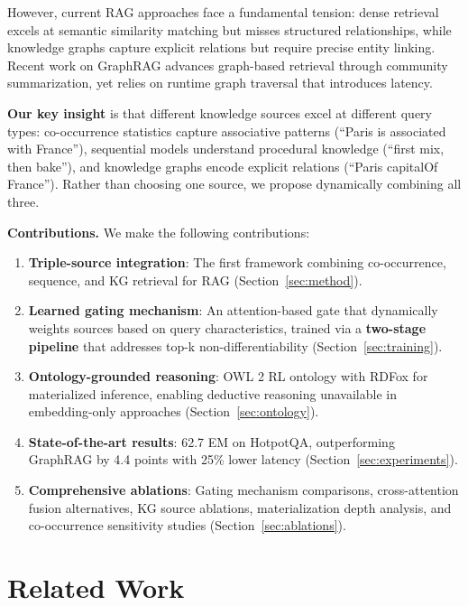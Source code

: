 \documentclass[10pt,twocolumn]{article}
\begin{document}
However, current RAG approaches face a fundamental tension: dense retrieval excels at semantic similarity matching but misses structured relationships, while knowledge graphs capture explicit relations but require precise entity linking. Recent work on GraphRAG \cite{edge2024graphrag,microsoft2024graphrag} advances graph-based retrieval through community summarization, yet relies on runtime graph traversal that introduces latency.

\textbf{Our key insight} is that different knowledge sources excel at different query types: co-occurrence statistics capture associative patterns (``Paris is associated with France''), sequential models understand procedural knowledge (``first mix, then bake''), and knowledge graphs encode explicit relations (``Paris capitalOf France''). Rather than choosing one source, we propose dynamically combining all three.

\textbf{Contributions.} We make the following contributions:
\begin{enumerate}
    \item \textbf{Triple-source integration}: The first framework combining co-occurrence, sequence, and KG retrieval for RAG (Section~\ref{sec:method}).
    \item \textbf{Learned gating mechanism}: An attention-based gate that dynamically weights sources based on query characteristics, trained via a \textbf{two-stage pipeline} that addresses top-k non-differentiability (Section~\ref{sec:training}).
    \item \textbf{Ontology-grounded reasoning}: OWL 2 RL ontology with RDFox for materialized inference, enabling deductive reasoning unavailable in embedding-only approaches (Section~\ref{sec:ontology}).
    \item \textbf{State-of-the-art results}: 62.7 EM on HotpotQA, outperforming GraphRAG by 4.4 points with 25\% lower latency (Section~\ref{sec:experiments}).
    \item \textbf{Comprehensive ablations}: Gating mechanism comparisons, cross-attention fusion alternatives, KG source ablations, materialization depth analysis, and co-occurrence sensitivity studies (Section~\ref{sec:ablations}).
\end{enumerate}

\section{Related Work}
\end{document}
